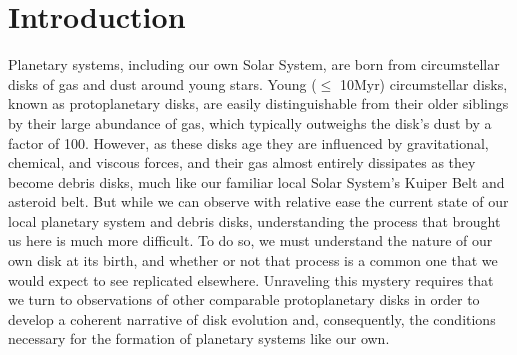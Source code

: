 \chapter{Introduction}

%





Planetary systems, including our own Solar System, are born from circumstellar disks of gas and dust around young stars. Young ($\leq$ 10Myr) circumstellar disks, known as protoplanetary disks, are easily distinguishable from their older siblings by their large abundance of gas, which typically outweighs the disk's dust by a factor of 100. However, as these disks age they are influenced by gravitational, chemical, and viscous forces, and their gas almost entirely dissipates as they become debris disks, much like our familiar local Solar System's Kuiper Belt and asteroid belt. But while we can observe with relative ease the current state of our local planetary system and debris disks, understanding the process that brought us here is much more difficult. To do so, we must understand the nature of our own disk at its birth, and whether or not that process is a common one that we would expect to see replicated elsewhere. Unraveling this mystery requires that we turn to observations of other comparable protoplanetary disks in order to develop a coherent narrative of disk evolution and, consequently, the conditions necessary for the formation of planetary systems like our own.

